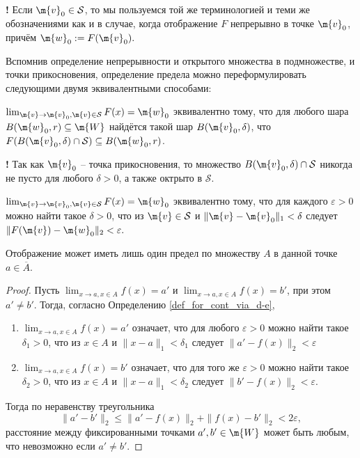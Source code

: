 \begin{mydanger}{\bf{!}}
Если $\m{v}_0 \in \mathcal{S}$, то мы пользуемся той же терминологией и теми же обозначениями как и в случае, когда отображение $F$ непрерывно в точке $\m{v}_0$, причём $\m{w}_0:=F(\m{v}_0).$
\end{mydanger}

Вспомнив определение непрерывности и открытого множества в подмножестве, и точки прикосновения, определение предела можно переформулировать следующими двумя эквивалентными способами:

\begin{definition}
 $\lim_{\m{v}\to \m{v}_0, \m{v} \in \mathcal{S}} F(x) = \m{w}_0$ эквивалентно тому, что для любого шара $B(\m{w}_0,r) \subseteq \m{W}$ найдётся такой шар $B(\m{v}_0,\delta)$, что $F(B(\m{v}_0,\delta)\cap \mathcal{S}) \subseteq B(\m{w}_0,r)$.
\end{definition}
\begin{mydanger}{\bf{!}}
    Так как $\m{v}_0$ -- точка прикосновения, то множество $B(\m{v}_0,\delta) \cap \mathcal{S}$ никогда не пусто для любого $\delta >0$, а также октрыто в $\mathcal{S}.$
\end{mydanger}

\begin{definition}\label{def_for_cont_via_d-e}
$\lim_{\m{v}\to \m{v}_0, \m{v} \in \mathcal{S}} F(x) = \m{w}_0$ эквивалентно тому, что для каждого $\varepsilon>0$ можно найти такое $\delta >0$, что из $\m{v} \in \mathcal{S}$ и $\|\m{v} - \m{v}_0\|_1 <\delta$ следует $\|F(\m{v}) - \m{w}_0\|_2<\varepsilon.$
\end{definition}

\begin{proposition}
    Отображение может иметь лишь один предел по множеству $A$ в данной точке $a \in \overline{A}.$
\end{proposition}
\begin{proof}
    Пусть  $\lim_{x \to a, x \in A}f(x) = a'$ и  $\lim_{x \to a, x \in A}f(x) = b'$, при этом $a' \ne b'$. Тогда, согласно Определению \ref{def_for_cont_via_d-e}, 
 \begin{enumerate}
     \item  $\lim_{x \to a, x \in A}f(x) = a'$ означает, что для любого $\varepsilon >0$ можно найти такое $\delta_1 >0$, что из $x \in A$ и $\|x-a\|_1<\delta_1$ следует $\|a'-f(x)\|_2<\varepsilon$
     \item $\lim_{x \to a, x \in A}f(x) = b'$ означает, что для того же $\varepsilon >0$ можно найти такое $\delta_2 >0$, что из $x \in A$ и $\|x-a\|_1<\delta_2$ следует $\|b'-f(x)\|_2<\varepsilon$.
 \end{enumerate}
Тогда по неравенству треугольника
\[
 \|a'-b'\|_2 \le \|a'- f(x)\|_2 + \|f(x)-b'\|_2 < 2\varepsilon,
\]
\ie расстояние между фиксированными точками $a',b' \in \m{W}$ может быть любым, что невозможно если $a' \ne b'.$
\end{proof}

